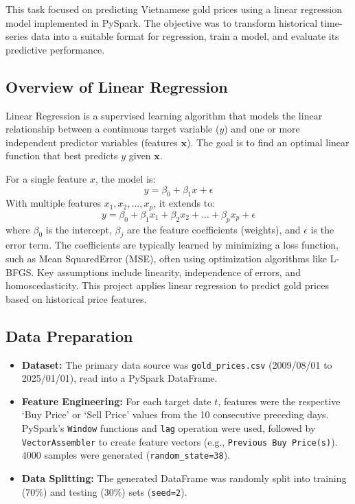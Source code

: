 This task focused on predicting Vietnamese gold prices using a linear regression model implemented in PySpark.
The objective was to transform historical time-series data into a suitable format for regression,
train a model, and evaluate its predictive performance.

\subsection{Overview of Linear Regression}
\label{subsec:overview-of-linear-regression}

Linear Regression is a supervised learning algorithm that models the linear relationship between a continuous target variable ($y$) and one or more independent predictor variables (features $\mathbf{x}$). The goal is to find an optimal linear function that best predicts $y$ given $\mathbf{x}$.

For a single feature $x$, the model is:
\begin{equation}
    y = \beta_0 + \beta_1 x + \epsilon
    \label{eq:simple_lr}
\end{equation}
With multiple features $x_1, x_2, \ldots, x_p$, it extends to:
\begin{equation}
    y = \beta_0 + \beta_1 x_1 + \beta_2 x_2 + \ldots + \beta_p x_p + \epsilon
    \label{eq:multiple_lr}
\end{equation}
where $\beta_0$ is the intercept, $\beta_j$ are the feature coefficients (weights), and $\epsilon$ is the error term. The coefficients are typically learned by minimizing a loss function, such as Mean SquaredError (MSE), often using optimization algorithms like L-BFGS. Key assumptions include linearity, independence of errors, and homoscedasticity. This project applies linear regression to predict gold prices based on historical price features.

\subsection{Data Preparation}
\label{subsec:data-preparation}
\begin{itemize}
    \item \textbf{Dataset:} The primary data source was \texttt{gold\_prices.csv} (2009/08/01 to 2025/01/01),
    read into a PySpark DataFrame.
    \item \textbf{Feature Engineering:} For each target date $t$, features were the respective `Buy Price' or `Sell Price' values from the 10 consecutive preceding days.
    PySpark's \texttt{Window} functions and \texttt{lag} operation were used, followed by \texttt{VectorAssembler} to create feature vectors (e.g., \texttt{Previous Buy Price(s)}). 4000 samples were generated (\texttt{random\_state=38}).
    \item \textbf{Data Splitting:} The generated DataFrame was randomly split into training (70\%) and testing (30\%) sets (\texttt{seed=2}).
\end{itemize}


